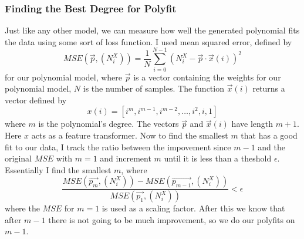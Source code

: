 \documentclass{report}
\begin{document}
            \subsubsection{Finding the Best Degree for Polyfit}
                Just like any other model, we can measure how well the generated polynomial fits the data using some sort of loss function. I used mean squared error, defined by
                \begin{equation}
                    MSE(\vec{p}, (N^X_i)) = \dfrac{1}{N}\sum_{i=0}^{N - 1}(N_i^X - \vec{p} \cdot \vec{x}(i))^2
                \end{equation}
                for our polynomial model, where $\vec{p}$ is a vector containing the weights for our polynomial model, $N$ is the number of samples. The function $\vec{x}(i)$ returns a vector defined by
                \begin{equation}
                    x(i) = [i^m, i^{m - 1}, i^{m-2}, \dots, i^2, i, 1]
                \end{equation}
                where $m$ is the polynomial's degree. The vectors $\vec{p}$ and $\vec{x}(i)$ have length $m + 1$. Here $x$ acts as a feature transformer. 
                \newline\indent
                Now to find the smallest $m$ that has a good fit to our data, I track the ratio between the impovement since $m - 1$ and the original $MSE$ with $m = 1$ and increment $m$ until it is less than a theshold $\epsilon$. Essentially I find the smallest $m$, where
                \begin{equation}
                    \dfrac{MSE(\vec{p_m}, (N_i^X)) - MSE(\vec{p_{m - 1}}, (N_i^X))}{MSE(\vec{p_1}, (N_i^X))} < \epsilon
                \end{equation}
                where the $MSE$ for $m = 1$ is used as a scaling factor. After this we know that after $m - 1$ there is not going to be much improvement, so we do our polyfits on $m - 1$.
\end{document}
